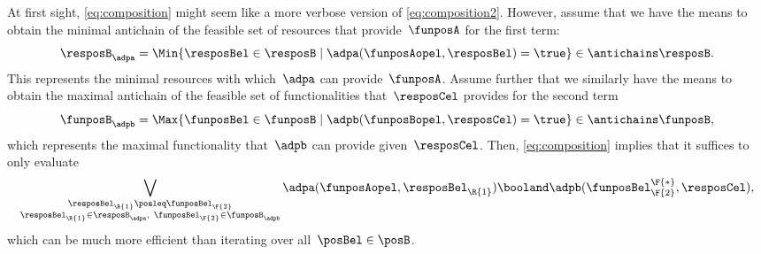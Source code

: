 \begin{remark}
    At first sight, \cref{eq:composition} might seem like a more verbose version of \cref{eq:composition2}.
    However, assume that we have the means to obtain the minimal antichain of the feasible set of resources that provide~$\funposA$ for the first term:
    \begin{equation*}
        \resposB_\adpa = \Min \{\resposBel\in \resposB \mid \adpa(\funposAopel,\resposBel)=\true\} \in \antichains \resposB.
    \end{equation*}
    This represents the minimal resources with which~$\adpa$ can provide~$\funposA$.
    Assume further that we similarly have the means to obtain the maximal antichain of the feasible set of functionalities that~$\resposCel$ provides for the second term
    \begin{equation*}
        \funposB_\adpb = \Max \{\funposBel\in \funposB \mid \adpb(\funposBopel,\resposCel)=\true\} \in \antichains \funposB,
    \end{equation*}
    which represents the maximal functionality that~$\adpb$ can provide given~$\resposCel$.
    Then, \cref{eq:composition} implies that it suffices to only evaluate
    \begin{equation*}
        \bigvee_{\substack{\resposBel_\R{1}\posleq\funposBel_\F{2} \\ \resposBel_\R{1}\in \resposB_\adpa,~ \funposBel_\F{2}\in\funposB_\adpb }} \adpa(\funposAopel,\resposBel_\R{1}) \booland \adpb(\funposBel_\F{2}^\F{*},\resposCel),
    \end{equation*}
    which can be much more efficient than iterating over all~$\posBel\in \posB$.
\end{remark}

